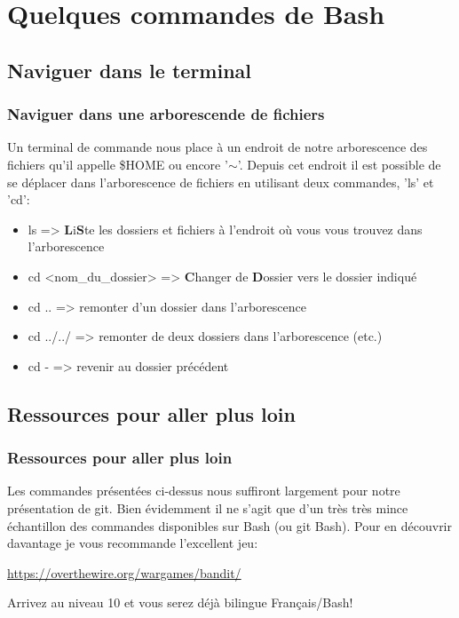 \documentclass{beamer}
\begin{document}
\section{Quelques commandes de Bash}

\subsection{Naviguer dans le terminal}

\begin{frame}[fragile]
\frametitle{Naviguer dans une arborescende de fichiers}

Un terminal de commande nous place à un endroit de notre arborescence des fichiers qu'il appelle \$HOME ou encore '$\sim$'. Depuis cet endroit il est possible de se déplacer dans l'arborescence de fichiers en utilisant deux commandes, 'ls' et 'cd':\\

\begin{itemize}
    \item ls => \textbf{L}i\textbf{S}te les dossiers et fichiers à l'endroit où vous vous trouvez dans l'arborescence
    \item cd <nom\_du\_dossier> => \textbf{C}hanger de \textbf{D}ossier vers le dossier indiqué
    \item cd .. => remonter d'un dossier dans l'arborescence
    \item cd ../../ => remonter de deux dossiers dans l'arborescence (etc.)
    \item cd - => revenir au dossier précédent
\end{itemize}

\end{frame}

\subsection{Ressources pour aller plus loin}

\begin{frame}[fragile]
\frametitle{Ressources pour aller plus loin}
Les commandes présentées ci-dessus nous suffiront largement pour notre présentation de git. Bien évidemment il ne s'agit que d'un très très mince échantillon des commandes disponibles sur Bash (ou git Bash). Pour en découvrir davantage je vous recommande l'excellent jeu:
\bigskip

\begin{center}
    \url{https://overthewire.org/wargames/bandit/}
\end{center}
\bigskip

Arrivez au niveau 10 et vous serez déjà bilingue Français/Bash!

\end{frame}
\end{document}
